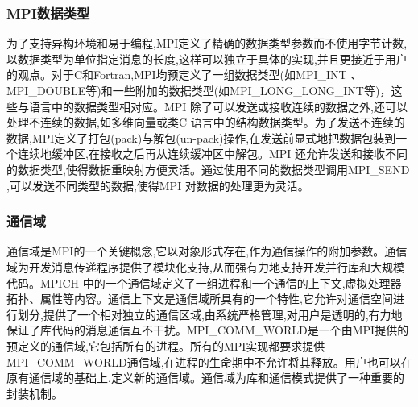\documentclass[paper=a4]{ctexart} %
\numberwithin{equation}{section} %
\numberwithin{figure}{section} %
\numberwithin{table}{section} %
\begin{document}
\subsubsection{MPI数据类型}
为了支持异构环境和易于编程,MPI定义了精确的数据类型参数而不使用字节计数,以数据类型为单位指定消息的长度,这样可以独立于具体的实现,并且更接近于用户的观点。对于C和Fortran,MPI均预定义了一组数据类型(如MPI\_INT 、MPI\_DOUBLE等)和一些附加的数据类型(如MPI\_LONG\_LONG\_INT等)，这些与语言中的数据类型相对应。MPI 除了可以发送或接收连续的数据之外,还可以处理不连续的数据,如多维向量或类C 语言中的结构数据类型。为了发送不连续的数据,MPI定义了打包(pack)与解包(un-pack)操作,在发送前显式地把数据包装到一个连续地缓冲区,在接收之后再从连续缓冲区中解包。MPI 还允许发送和接收不同的数据类型,使得数据重映射方便灵活。通过使用不同的数据类型调用MPI\_SEND ,可以发送不同类型的数据,使得MPI 对数据的处理更为灵活。

\subsubsection{通信域}
通信域是MPI的一个关键概念,它以对象形式存在,作为通信操作的附加参数。通信域为开发消息传递程序提供了模块化支持,从而强有力地支持开发并行库和大规模代码。MPICH 中的一个通信域定义了一组进程和一个通信的上下文,虚拟处理器拓扑、属性等内容。通信上下文是通信域所具有的一个特性,它允许对通信空间进行划分,提供了一个相对独立的通信区域,由系统严格管理,对用户是透明的,有力地保证了库代码的消息通信互不干扰。MPI_COMM_WORLD是一个由MPI提供的预定义的通信域,它包括所有的进程。所有的MPI实现都要求提供MPI_COMM_WORLD通信域,在进程的生命期中不允许将其释放。用户也可以在原有通信域的基础上,定义新的通信域。通信域为库和通信模式提供了一种重要的封装机制。
\end{document}
